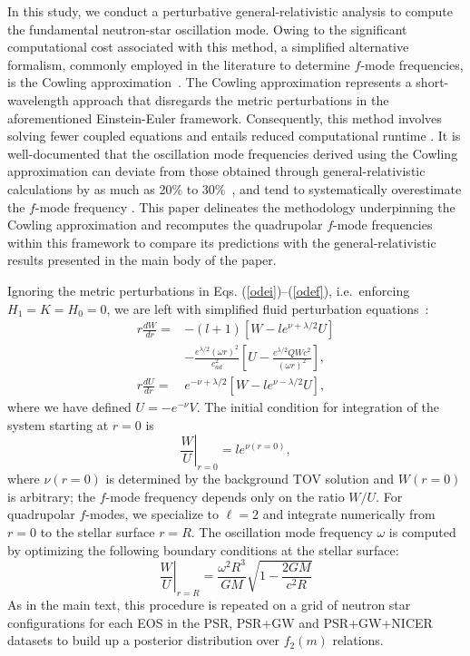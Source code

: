\documentclass[aps,prd,twocolumn,superscriptaddress,footinbib]{revtex4-1}
\newcommand{\PL}[1]{\textsf{\color{green!80!black}{\textsuperscript{PL}#1}}}
\begin{document}
In this study, we conduct a perturbative general-relativistic analysis to compute the fundamental neutron-star oscillation mode. Owing to the significant computational cost associated with this method, a simplified alternative formalism, commonly employed in the literature to determine $f$-mode frequencies, is the Cowling approximation~\cite{cowling1941non, finn1988relativistic}. The Cowling approximation represents a short-wavelength approach that disregards the metric perturbations in the aforementioned Einstein-Euler framework. Consequently, this method involves solving fewer coupled equations and entails reduced computational runtime \cite{lindblom1990accuracy, doneva2012nonradial, samuelsson2007neutron}. It is well-documented that the oscillation mode frequencies derived using the Cowling approximation can deviate from those obtained through general-relativistic calculations by as much as 20\% to 30\%~\cite{yoshida1997accuracy, athulkp}, and tend to systematically overestimate the $f$-mode frequency \cite{Sotani_2020}. This paper delineates the methodology underpinning the Cowling approximation and recomputes the quadrupolar $f$-mode frequencies within this framework to compare its predictions with the general-relativistic results presented in the main body of the paper.

Ignoring the metric perturbations in Eqs. (\ref{odei})–(\ref{odef}), i.e.~enforcing $H_1 = K = H_0 = 0$, we are left with simplified fluid perturbation equations~\cite{2204}:
\begin{align} %
   r\frac{dW}{dr} = & -(l+1) \left[W - l e^{\nu + \lambda/2} U \right] \\ & - \frac{e^{\lambda/2}(\omega r)^2}{c_{ad}^2} \left[U - \frac{e^{\lambda/2}QWc^2}{(\omega r)^2} \right] , \nonumber \\ r \frac{dU}{dr} = & e^{- \nu + \lambda/2 } \left[W - l e^{\nu - \lambda/2} U\right] ,
\end{align}
where we have defined $U = -e^{-\nu}V$. The initial condition for integration of the system starting at $r=0$ is~\cite{2205}
\begin{equation}
\left.\frac{W}{U}\right|_{r=0}=l e^{\nu(r=0)} ,
\end{equation}
where $\nu(r=0)$ is determined by the background TOV solution and $W(r=0)$ is arbitrary; the $f$-mode frequency depends only on the ratio $W/U$. For quadrupolar $f$-modes, we specialize to $\ell = 2$ and integrate numerically from $r=0$ to the stellar surface $r=R$. The oscillation mode frequency $\omega$ is computed by optimizing the following boundary conditions at the stellar surface:%
\begin{equation}
\left.\frac{W}{U}\right|_{r=R}=\frac{\omega^{2} R^{3}}{G M} \sqrt{1-\frac{2 G M}{c^{2} R}}
\end{equation}
As in the main text, this procedure is repeated on a grid of neutron star configurations for each EOS in the PSR, PSR+GW and PSR+GW+NICER datasets to build up a posterior distribution over $f_2(m)$ relations.
\end{document}

